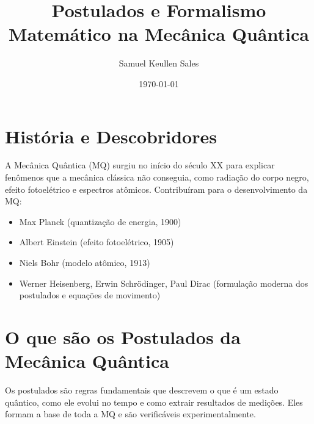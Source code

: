 \documentclass[a4paper,12pt]{article}
\title{Postulados e Formalismo Matemático na Mecânica Quântica}
\author{Samuel Keullen Sales}
\date{\today}
\begin{document}
\maketitle

\section*{História e Descobridores}
A Mecânica Quântica (MQ) surgiu no início do século XX para explicar fenômenos que a mecânica clássica não conseguia, como radiação do corpo negro, efeito fotoelétrico e espectros atômicos. Contribuíram para o desenvolvimento da MQ:
\begin{itemize}
    \item Max Planck (quantização de energia, 1900)
    \item Albert Einstein (efeito fotoelétrico, 1905)
    \item Niels Bohr (modelo atômico, 1913)
    \item Werner Heisenberg, Erwin Schrödinger, Paul Dirac (formulação moderna dos postulados e equações de movimento)
\end{itemize}

\section*{O que são os Postulados da Mecânica Quântica}
Os postulados são regras fundamentais que descrevem o que é um estado quântico, como ele evolui no tempo e como extrair resultados de medições. Eles formam a base de toda a MQ e são verificáveis experimentalmente.
\end{document}

